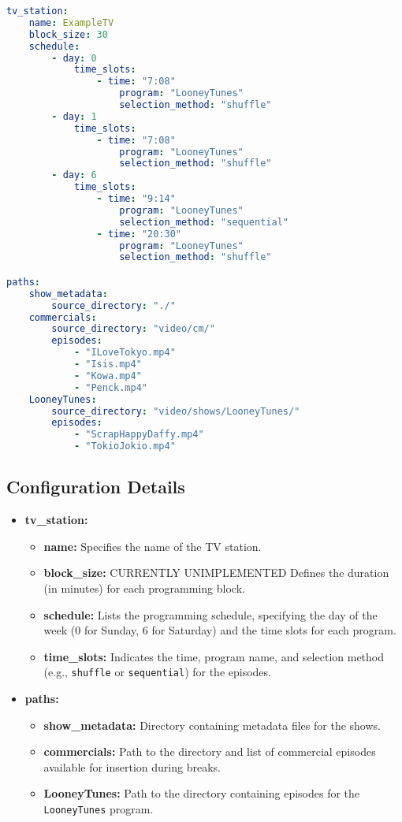 \documentclass{article}
\begin{document}
	\begin{lstlisting}[language=yaml]
tv_station:
	name: ExampleTV
	block_size: 30
	schedule:
		- day: 0
			time_slots:
				- time: "7:08"
					program: "LooneyTunes"
					selection_method: "shuffle"
		- day: 1
			time_slots:
				- time: "7:08"
					program: "LooneyTunes"
					selection_method: "shuffle"
		- day: 6
			time_slots:
				- time: "9:14"
					program: "LooneyTunes"
					selection_method: "sequential"
				- time: "20:30"
					program: "LooneyTunes"
					selection_method: "shuffle"

paths:
	show_metadata:
		source_directory: "./"
	commercials:
		source_directory: "video/cm/"
		episodes:
			- "ILoveTokyo.mp4"
			- "Isis.mp4"
			- "Kowa.mp4"
			- "Penck.mp4"
	LooneyTunes:
		source_directory: "video/shows/LooneyTunes/"
		episodes:
			- "ScrapHappyDaffy.mp4"
			- "TokioJokio.mp4"
	\end{lstlisting}
	
	\subsection{Configuration Details}
	
	\begin{itemize}
		\item \textbf{tv\_station:}
		\begin{itemize}
			\item \textbf{name:} Specifies the name of the TV station.
			\item \textbf{block\_size:} CURRENTLY UNIMPLEMENTED Defines the duration (in minutes) for each programming block.
			\item \textbf{schedule:} Lists the programming schedule, specifying the day of the week (0 for Sunday, 6 for Saturday) and the time slots for each program.
			\item \textbf{time\_slots:} Indicates the time, program name, and selection method (e.g., \texttt{shuffle} or \texttt{sequential}) for the episodes.
		\end{itemize}
		
		\item \textbf{paths:}
		\begin{itemize}
			\item \textbf{show\_metadata:} Directory containing metadata files for the shows.
			\item \textbf{commercials:} Path to the directory and list of commercial episodes available for insertion during breaks.
			\item \textbf{LooneyTunes:} Path to the directory containing episodes for the \texttt{LooneyTunes} program.
		\end{itemize}
	\end{itemize}
	
\end{document}
